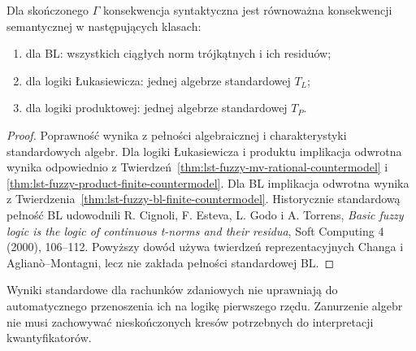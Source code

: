 \begin{twierdzenie}
\label{thm:lst-fuzzy-finite-standard}
Dla skończonego $\Gamma$ konsekwencja syntaktyczna jest
równoważna konsekwencji semantycznej w następujących klasach:
\begin{enumerate}
\item dla BL: wszystkich ciągłych norm trójkątnych i ich residuów;
\item dla logiki Łukasiewicza: jednej algebrze standardowej $T_L$;
\item dla logiki produktowej: jednej algebrze standardowej $T_P$.
\end{enumerate}
\end{twierdzenie}
\begin{proof}
Poprawność wynika z pełności algebraicznej i charakterystyki
standardowych algebr. Dla logiki Łukasiewicza i produktu
implikacja odwrotna wynika odpowiednio z
Twierdzeń~\ref{thm:lst-fuzzy-mv-rational-countermodel}
i \ref{thm:lst-fuzzy-product-finite-countermodel}.
Dla BL implikacja odwrotna wynika z
Twierdzenia~\ref{thm:lst-fuzzy-bl-finite-countermodel}.
Historycznie standardową pełność BL udowodnili
R. Cignoli, F. Esteva, L. Godo i A. Torrens,
\emph{Basic fuzzy logic is the logic of continuous
t-norms and their residua}, Soft Computing 4 (2000),
106--112. Powyższy dowód używa twierdzeń reprezentacyjnych
Changa i Aglianò--Montagni, lecz nie zakłada pełności
standardowej BL.
\end{proof}

\begin{uwaga}
Wyniki standardowe dla rachunków zdaniowych nie uprawniają
do automatycznego przenoszenia ich na logikę pierwszego rzędu.
Zanurzenie algebr nie musi zachowywać nieskończonych kresów
potrzebnych do interpretacji kwantyfikatorów.
\end{uwaga}

